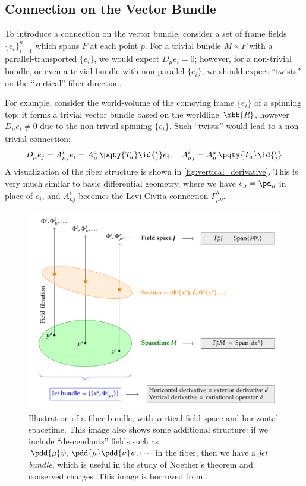 \documentclass[a4paper,11pt]{article}
\begin{document}
\subsection{Connection on the Vector Bundle}
	To introduce a connection on the vector bundle, consider a set of frame fields $\{e_i\}_{i = 1}^n$ which spans $F$ at each point $p$. For a trivial bundle $M\times F$ with a parallel-transported $\{e_i\}$, we would expect $D_\mu e_i = 0$; however, for a non-trivial bundle, or even a trivial bundle with non-parallel $\{e_i\}$, we should expect ``twists'' on the ``vertical'' fiber direction. 
	
	For example, consider the world-volume of the comoving frame $\{e_i\}$ of a spinning top; it forms a trivial vector bundle based on the worldline $\mbb{R}$, however $D_\mu e_i \ne 0$ due to the non-trivial spinning $\{e_i\}$. Such ``twists'' would lead to a non-trivial connection:
	\begin{equation}
		D_\mu e_j
		= A^i_{\mu j} e_i
		= A^a_\mu\,\pqty{T_a}\id{^i_j} e_i,
	\quad
		A^i_{\mu j}
		= A^a_\mu\,\pqty{T_a}\id{^i_j}
	\end{equation}
	A visualization of the fiber structure is shown in \autoref{fig:vertical_derivative}. 
	This is very much similar to basic differential geometry, where we have $e_\mu = \pd_\mu$ in place of $e_i$, and $A^i_{\mu j}$ becomes the Levi-Civita connection $\Gamma^\lambda_{\mu\nu}$. 
	
	\begin{figure}[!ht]
	\centering
	\includegraphics[width=.85\linewidth]{img/vertical_derivative.png}
	\caption{Illustration of a fiber bundle, with vertical field space and horizontal spacetime. This image also shows some additional structure: if we include ``descendants'' fields such as $
		\pdd{\mu}\psi,\,\pdd{\mu}\pdd{\nu}\psi,\cdots
	$ in the fiber, then we have a \textit{jet bundle}, which is useful in the study of Noether's theorem and conserved charges. This image is borrowed from \cite{Compere:2018aar}. }
	\label{fig:vertical_derivative}
	\end{figure}
	
\end{document}
